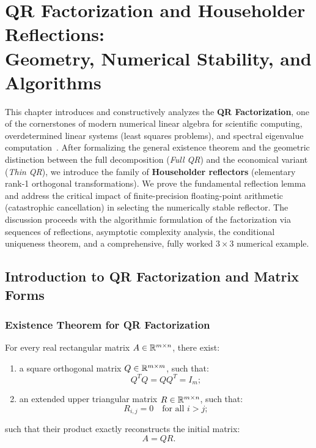 \chapter[QR Factorization and Householder Reflections]{QR Factorization and Householder Reflections:\\Geometry, Numerical Stability, and Algorithms}
\label{chap:qr-factorization-householder-reflections}
\label{chap:fattorizzazione-qr-riflessioni-householder-en}

This chapter introduces and constructively analyzes the \textbf{QR Factorization}, one of the cornerstones of modern numerical linear algebra for scientific computing, overdetermined linear systems (least squares problems), and spectral eigenvalue computation~\cite{golub2013matrix,trefethen1997numerical}. After formalizing the general existence theorem and the geometric distinction between the full decomposition (\textit{Full QR}) and the economical variant (\textit{Thin QR}), we introduce the family of \textbf{Householder reflectors} (elementary rank-1 orthogonal transformations). We prove the fundamental reflection lemma and address the critical impact of finite-precision floating-point arithmetic (catastrophic cancellation) in selecting the numerically stable reflector. The discussion proceeds with the algorithmic formulation of the factorization via sequences of reflections, asymptotic complexity analysis, the conditional uniqueness theorem, and a comprehensive, fully worked $3 \times 3$ numerical example.

\FloatBarrier
\section{Introduction to QR Factorization and Matrix Forms}
\label{sec:intro-qr-forms-en}

\subsection{Existence Theorem for QR Factorization}

\begin{theorem}
\label{thm:qr-existence-full-en}
For every real rectangular matrix $A \in \mathbb{R}^{m \times n}$, there exist:
\begin{enumerate}
    \item a square orthogonal matrix $Q \in \mathbb{R}^{m \times m}$, such that:
    \begin{equation}
        Q^T Q = Q Q^T = I_m;
    \end{equation}
    \item an extended upper triangular matrix $R \in \mathbb{R}^{m \times n}$, such that:
    \begin{equation}
        R_{i,j} = 0 \quad \text{for all } i > j;
    \end{equation}
\end{enumerate}
such that their product exactly reconstructs the initial matrix:
\begin{equation}
    A = Q R.
\end{equation}
\end{theorem}


